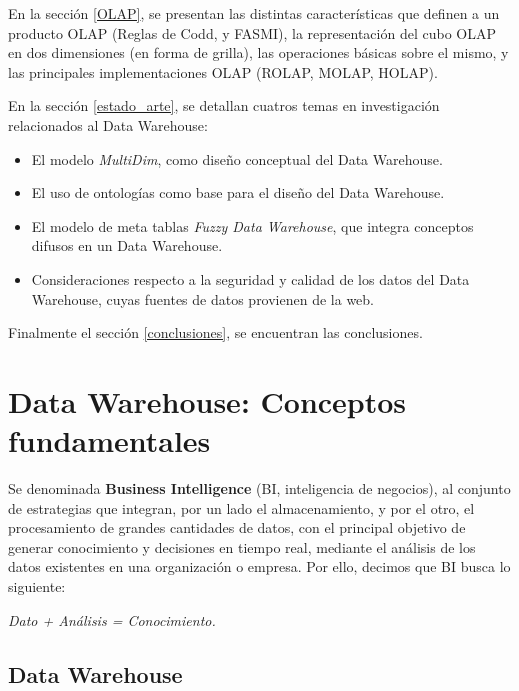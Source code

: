 \documentclass[a4paper,11pt]{article}
\begin{document}
    En la sección \ref{OLAP}, se presentan las distintas características que definen a un producto OLAP (Reglas de Codd, y FASMI), la representación del cubo OLAP en
    dos dimensiones (en forma de grilla), las operaciones básicas sobre el mismo, y las principales implementaciones OLAP (ROLAP, MOLAP, HOLAP).
    
    En la sección \ref{estado_arte}, se detallan cuatros temas en investigación relacionados al Data Warehouse:
    \begin{itemize}
      \item El modelo \textit{MultiDim}, como diseño conceptual del Data Warehouse.
      \item El uso de ontologías como base para el diseño del Data Warehouse.
      \item El modelo de meta tablas \textit{Fuzzy Data Warehouse}, que integra conceptos difusos en un Data Warehouse.
      \item Consideraciones respecto a la seguridad y calidad de los datos del Data Warehouse, cuyas fuentes de datos provienen de la web.
    \end{itemize}
    
    Finalmente el sección \ref{conclusiones}, se encuentran las conclusiones.
    


    \section{Data Warehouse: Conceptos fundamentales} \label{conceptos_fundamentales}
    
    Se denominada \textbf{Business Intelligence} (BI, inteligencia de negocios), al conjunto de estrategias que integran, por un lado el almacenamiento, y
    por el otro, el procesamiento de grandes cantidades de datos, con el principal objetivo de generar conocimiento y decisiones en tiempo real, mediante 
    el análisis de los datos existentes en una organización o empresa. Por ello, decimos que BI busca lo siguiente:
    
    \begin{center}
      \textit{Dato + Análisis = Conocimiento.}
    \end{center}


    \subsection{Data Warehouse}
    
\end{document}
